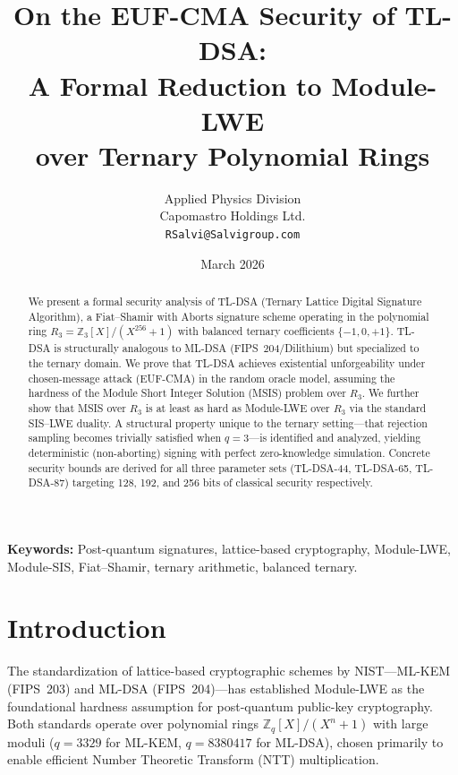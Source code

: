\documentclass[11pt,a4paper]{article}
\title{%
  \textbf{On the EUF-CMA Security of TL-DSA:\\
  A Formal Reduction to Module-LWE\\
  over Ternary Polynomial Rings}%
}
\author{%
  Applied Physics Division\\
  Capomastro Holdings Ltd.\\
  \texttt{RSalvi@Salvigroup.com}%
}
\date{March 2026}
\theoremstyle{definition}
\newcommand{\Z}{\mathbb{Z}}
\begin{document}
\maketitle

\begin{abstract}
We present a formal security analysis of TL-DSA (Ternary Lattice Digital Signature Algorithm), a Fiat--Shamir with Aborts signature scheme operating in the polynomial ring $R_3 = \Z_3[X]/(X^{256}+1)$ with balanced ternary coefficients $\{-1, 0, +1\}$. TL-DSA is structurally analogous to ML-DSA (FIPS~204/Dilithium) but specialized to the ternary domain. We prove that TL-DSA achieves existential unforgeability under chosen-message attack (EUF-CMA) in the random oracle model, assuming the hardness of the Module Short Integer Solution (MSIS) problem over $R_3$. We further show that MSIS over $R_3$ is at least as hard as Module-LWE over $R_3$ via the standard SIS--LWE duality. A structural property unique to the ternary setting---that rejection sampling becomes trivially satisfied when $q=3$---is identified and analyzed, yielding deterministic (non-aborting) signing with perfect zero-knowledge simulation. Concrete security bounds are derived for all three parameter sets (TL-DSA-44, TL-DSA-65, TL-DSA-87) targeting 128, 192, and 256 bits of classical security respectively.
\end{abstract}

\medskip
\noindent\textbf{Keywords:} Post-quantum signatures, lattice-based cryptography, Module-LWE, Module-SIS, Fiat--Shamir, ternary arithmetic, balanced ternary.

\tableofcontents

\section{Introduction}
\label{sec:intro}

The standardization of lattice-based cryptographic schemes by NIST---ML-KEM (FIPS~203) and ML-DSA (FIPS~204)---has established Module-LWE as the foundational hardness assumption for post-quantum public-key cryptography. Both standards operate over polynomial rings $\Z_q[X]/(X^n+1)$ with large moduli ($q = 3329$ for ML-KEM, $q = 8380417$ for ML-DSA), chosen primarily to enable efficient Number Theoretic Transform (NTT) multiplication.
\end{document}
